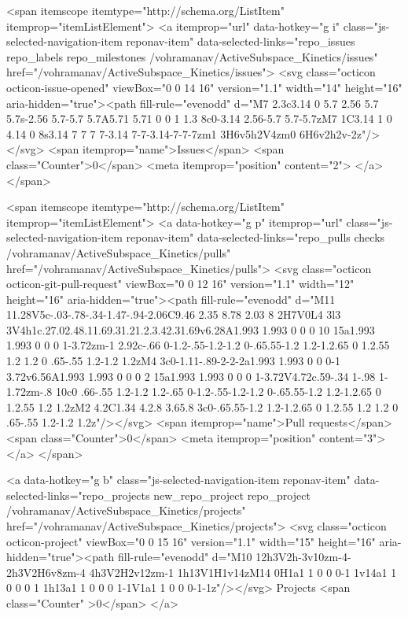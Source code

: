     <span itemscope itemtype="http://schema.org/ListItem" itemprop="itemListElement">
      <a itemprop="url" data-hotkey="g i" class="js-selected-navigation-item reponav-item" data-selected-links="repo_issues repo_labels repo_milestones /vohramanav/ActiveSubspace_Kinetics/issues" href="/vohramanav/ActiveSubspace_Kinetics/issues">
        <svg class="octicon octicon-issue-opened" viewBox="0 0 14 16" version="1.1" width="14" height="16" aria-hidden="true"><path fill-rule="evenodd" d="M7 2.3c3.14 0 5.7 2.56 5.7 5.7s-2.56 5.7-5.7 5.7A5.71 5.71 0 0 1 1.3 8c0-3.14 2.56-5.7 5.7-5.7zM7 1C3.14 1 0 4.14 0 8s3.14 7 7 7 7-3.14 7-7-3.14-7-7-7zm1 3H6v5h2V4zm0 6H6v2h2v-2z"/></svg>
        <span itemprop="name">Issues</span>
        <span class="Counter">0</span>
        <meta itemprop="position" content="2">
</a>    </span>

  <span itemscope itemtype="http://schema.org/ListItem" itemprop="itemListElement">
    <a data-hotkey="g p" itemprop="url" class="js-selected-navigation-item reponav-item" data-selected-links="repo_pulls checks /vohramanav/ActiveSubspace_Kinetics/pulls" href="/vohramanav/ActiveSubspace_Kinetics/pulls">
      <svg class="octicon octicon-git-pull-request" viewBox="0 0 12 16" version="1.1" width="12" height="16" aria-hidden="true"><path fill-rule="evenodd" d="M11 11.28V5c-.03-.78-.34-1.47-.94-2.06C9.46 2.35 8.78 2.03 8 2H7V0L4 3l3 3V4h1c.27.02.48.11.69.31.21.2.3.42.31.69v6.28A1.993 1.993 0 0 0 10 15a1.993 1.993 0 0 0 1-3.72zm-1 2.92c-.66 0-1.2-.55-1.2-1.2 0-.65.55-1.2 1.2-1.2.65 0 1.2.55 1.2 1.2 0 .65-.55 1.2-1.2 1.2zM4 3c0-1.11-.89-2-2-2a1.993 1.993 0 0 0-1 3.72v6.56A1.993 1.993 0 0 0 2 15a1.993 1.993 0 0 0 1-3.72V4.72c.59-.34 1-.98 1-1.72zm-.8 10c0 .66-.55 1.2-1.2 1.2-.65 0-1.2-.55-1.2-1.2 0-.65.55-1.2 1.2-1.2.65 0 1.2.55 1.2 1.2zM2 4.2C1.34 4.2.8 3.65.8 3c0-.65.55-1.2 1.2-1.2.65 0 1.2.55 1.2 1.2 0 .65-.55 1.2-1.2 1.2z"/></svg>
      <span itemprop="name">Pull requests</span>
      <span class="Counter">0</span>
      <meta itemprop="position" content="3">
</a>  </span>

    <a data-hotkey="g b" class="js-selected-navigation-item reponav-item" data-selected-links="repo_projects new_repo_project repo_project /vohramanav/ActiveSubspace_Kinetics/projects" href="/vohramanav/ActiveSubspace_Kinetics/projects">
      <svg class="octicon octicon-project" viewBox="0 0 15 16" version="1.1" width="15" height="16" aria-hidden="true"><path fill-rule="evenodd" d="M10 12h3V2h-3v10zm-4-2h3V2H6v8zm-4 4h3V2H2v12zm-1 1h13V1H1v14zM14 0H1a1 1 0 0 0-1 1v14a1 1 0 0 0 1 1h13a1 1 0 0 0 1-1V1a1 1 0 0 0-1-1z"/></svg>
      Projects
      <span class="Counter" >0</span>
</a>

